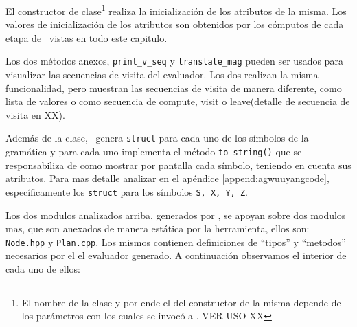 \begin{description}
\begin{itemize}
El constructor de clase\footnote{El nombre de la clase y por ende el del constructor de la misma depende de los parámetros con los cuales se invocó a \maggen. VER USO XX} realiza la inicialización de los atributos de la misma. Los valores de inicialización de los atributos son obtenidos por los cómputos de cada etapa de \maggen\ vistas en todo este capitulo.

Los dos métodos anexos, \texttt{print\_v\_seq} y \texttt{translate\_mag} pueden ser usados para visualizar las secuencias de visita del evaluador. Los dos realizan la misma funcionalidad, pero muestran las secuencias de visita de manera diferente, como lista de valores o como secuencia de compute, visit o  leave(detalle de secuencia de visita en XX).
\end{itemize}
 
\end{description}

Además de la clase, \maggen\ genera \texttt{struct} para cada uno de los símbolos de la gramática y para cada uno implementa el método \texttt{to\_string()} que se responsabiliza de como mostrar por pantalla cada símbolo, teniendo en cuenta sus atributos. Para mas detalle analizar en el apéndice \ref{append:agwuuyangcode}, específicamente los \texttt{struct} para los símbolos \texttt{S, X, Y, Z}.

\normalsize
Los dos modulos analizados arriba, generados por \maggen, se apoyan sobre dos modulos mas, que son anexados de manera estática por la herramienta, ellos son: \texttt{Node.hpp} y \texttt{Plan.cpp}. Los mismos contienen definiciones de ``tipos'' y ``metodos'' necesarios por el el evaluador generado.
A continuación observamos el interior de cada uno de ellos:

\tiny


\tiny

\normalsize


